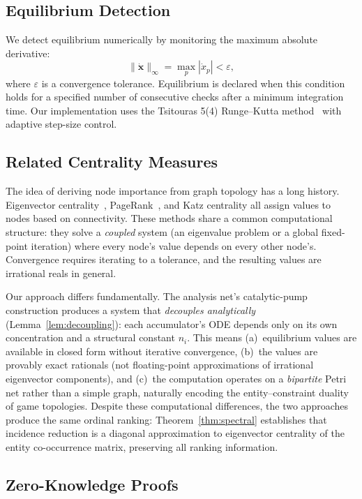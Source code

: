 \documentclass[11pt,a4paper]{article}
\begin{document}
\subsection{Equilibrium Detection}

We detect equilibrium numerically by monitoring the maximum absolute derivative:
\[
  \|\dot{\mathbf{x}}\|_\infty = \max_p |\dot{x}_p| < \varepsilon,
\]
where $\varepsilon$ is a convergence tolerance.
Equilibrium is declared when this condition holds for a specified number of consecutive checks after a minimum integration time.
Our implementation uses the Tsitouras 5(4) Runge--Kutta method~\cite{tsitouras2011} with adaptive step-size control.

\subsection{Related Centrality Measures}

The idea of deriving node importance from graph topology has a long history.
Eigenvector centrality~\cite{bonacich1987}, PageRank~\cite{page1999}, and Katz centrality all assign values to nodes based on connectivity.
These methods share a common computational structure: they solve a \emph{coupled} system (an eigenvalue problem or a global fixed-point iteration) where every node's value depends on every other node's.
Convergence requires iterating to a tolerance, and the resulting values are irrational reals in general.

Our approach differs fundamentally.
The analysis net's catalytic-pump construction produces a system that \emph{decouples analytically} (Lemma~\ref{lem:decoupling}): each accumulator's ODE depends only on its own concentration and a structural constant $n_i$.
This means (a)~equilibrium values are available in closed form without iterative convergence, (b)~the values are provably exact rationals (not floating-point approximations of irrational eigenvector components), and (c)~the computation operates on a \emph{bipartite} Petri net rather than a simple graph, naturally encoding the entity--constraint duality of game topologies.
Despite these computational differences, the two approaches produce the same ordinal ranking: Theorem~\ref{thm:spectral} establishes that incidence reduction is a diagonal approximation to eigenvector centrality of the entity co-occurrence matrix, preserving all ranking information.

\subsection{Zero-Knowledge Proofs}
\end{document}
